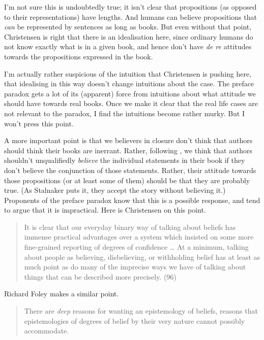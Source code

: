 \noindent I'm not sure this is undoubtedly true; it isn't clear that propositions (as opposed to their representations) have lengths. And humans can believe propositions that \textit{can} be represented by sentences as long as books. But even without that point, Christensen is right that there is an idealisation here, since ordinary humans do not know exactly what is in a given book, and hence don't have \textit{de re} attitudes towards the propositions expressed in the book.

I'm actually rather suspicious of the intuition that Christensen is pushing here, that idealising in this way doesn't change intuitions about the case. The preface paradox gets a lot of its (apparent) force from intuitions about what attitude we should have towards real books. Once we make it clear that the real life cases are not relevant to the paradox, I find the intuitions become rather murky. But I won't press this point. 

A more important point is that we believers in closure don't think that authors should think their books are inerrant. Rather, following \cite{Stalnaker1984}, we think that authors shouldn't unqualifiedly \textit{believe} the individual statements in their book if they don't believe the conjunction of those statements. Rather, their attitude towards those propositions (or at least some of them) should be that they are probably true. (As Stalnaker puts it, they accept the story without believing it.) Proponents of the preface paradox know that this is a possible response, and tend to argue that it is impractical. Here is Christensen on this point.

\begin{quote}
It is clear that our everyday binary way of talking about beliefs has immense practical advantages over a system which insisted on some more fine-grained reporting of degrees of confidence {\dots} At a minimum, talking about people as believing, disbelieving, or withholding belief has at least as much point as do many of the imprecise ways we have of talking about things that can be described more precisely. (96)
\end{quote}

\noindent Richard Foley makes a similar point.

\begin{quote}
There are \textit{deep} reasons for wanting an epistemology of beliefs, reasons that epistemologies of degrees of belief by their very nature cannot possibly accommodate. \citep[170, my emphasis]{Foley1993}
\end{quote}

